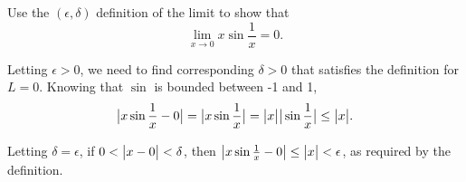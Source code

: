 \begin{example}
	Use the $(\epsilon, \delta)$ definition of the limit to show that
	\begin{equation*}
		\lim_{x\to 0}{x\sin{\frac{1}{x}}} = 0.
	\end{equation*}
\end{example}
\begin{answer}
	Letting $\epsilon > 0$, we need to find corresponding $\delta > 0$ that satisfies the definition for $L = 0$.
	Knowing that $\sin$ is bounded between -1 and 1,
	\begin{equation*}
		\big\lvert x\sin{\frac{1}{x}} - 0 \big\rvert = \big\lvert x\sin{\frac{1}{x}} \big\rvert = \big\lvert x \big\rvert\big\lvert \sin{\frac{1}{x}} \big\rvert \leq \big\lvert x \big\rvert.
	\end{equation*}
	
	Letting $\delta = \epsilon$, if $0 < \big\lvert x - 0 \big\rvert < \delta$, then $\big\lvert x\sin{\frac{1}{x}} - 0 \big\rvert \leq \big\lvert x \big\rvert < \epsilon$, as required by the definition.
\end{answer}